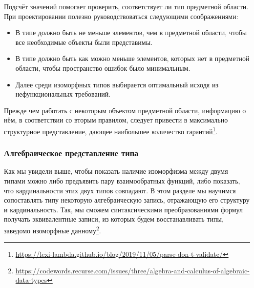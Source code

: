 Подсчёт значений помогает проверить, соответствует ли тип предметной области.
При проектировании полезно руководствоваться следующими соображениями:
\begin{itemize}
    \item В типе должно быть не меньше элементов, чем в предметной области, чтобы все необходимые объекты были представимы.
    \item В типе должно быть как можно меньше элементов, которых нет в предметной области, чтобы пространство ошибок было минимальным.
    \item Далее среди изоморфных типов выбирается оптимальный исходя из нефункциональных требований.
\end{itemize}

Прежде чем работать с некоторым объектом предметной области, информацию о нём, в соответствии со вторым правилом, следует привести в максимально структурное представление, дающее наибольшее количество гарантий\footnote{\url{https://lexi-lambda.github.io/blog/2019/11/05/parse-don-t-validate/}}.

\subsubsection{Алгебраическое представление типа} \label{subsubsec:type-algebra}

Как мы увидели выше, чтобы показать наличие изоморфизма между двумя типами можно либо предъявить пару взаимообратных функций, либо показать, что кардинальности этих двух типов совпадают.
В этом разделе мы научимся сопоставлять типу некоторую алгебраическую запись, отражающую его структуру и кардинальность.
Так, мы сможем синтаксическими преобразованиями формул получать эквивалентные записи, из которых будем восстанавливать типы, заведомо изоморфные данному\footnote{\url{https://codewords.recurse.com/issues/three/algebra-and-calculus-of-algebraic-data-types}}.

